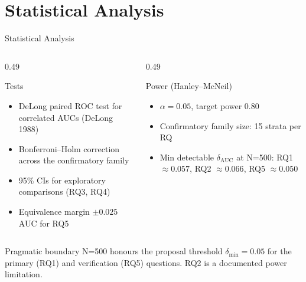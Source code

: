 \documentclass[aspectratio=169,11pt]{beamer}
\newcommand{\icite}[1]{{\footnotesize\color{umgray!85}#1}}
\begin{document}
\section{Statistical Analysis}
\begin{frame}{Statistical Analysis}
\small
\begin{columns}[T]
\begin{column}{0.49\textwidth}
\begin{block}{Tests}
\begin{itemize}
\item DeLong paired ROC test for correlated AUCs \icite{(DeLong 1988)}
\item Bonferroni--Holm correction across the confirmatory family
\item 95\% CIs for exploratory comparisons (RQ3, RQ4)
\item Equivalence margin $\pm 0.025$ AUC for RQ5
\end{itemize}
\end{block}
\end{column}
\begin{column}{0.49\textwidth}
\begin{block}{Power (Hanley--McNeil)}
\begin{itemize}
\item $\alpha = 0.05$, target power $0.80$
\item Confirmatory family size: 15 strata per RQ
\item Min detectable $\delta_\text{AUC}$ at N=500: RQ1 $\approx 0.057$, RQ2 $\approx 0.066$, RQ5 $\approx 0.050$
\end{itemize}
\end{block}
\end{column}
\end{columns}
\vspace{0.1cm}
\begin{alertblock}{Pragmatic boundary}
N=500 honours the proposal threshold $\delta_\text{min}\!=\!0.05$ for the primary (RQ1) and verification (RQ5) questions. RQ2 is a documented power limitation.
\end{alertblock}
\end{frame}

\end{document}
